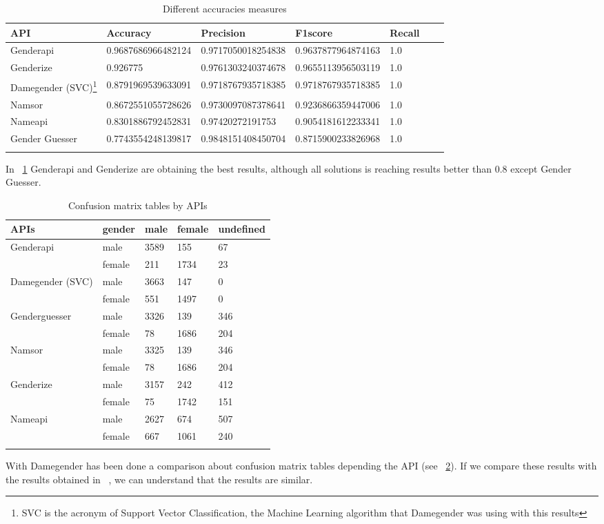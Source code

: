 \documentclass[a4paper]{article}
\begin{document}
\begin{longtable}[]{@{}lllllll@{}}
  \toprule
  API & Accuracy & Precision & F1score & Recall\tabularnewline
\midrule
\endhead
Genderapi & 0.9687686966482124 & 0.9717050018254838 & 0.9637877964874163 & 1.0\tabularnewline
Genderize & 0.926775 & 0.9761303240374678 & 0.9655113956503119 & 1.0\tabularnewline
Damegender (SVC)\footnote{SVC is the acronym of Support Vector Classification, the Machine Learning algorithm that Damegender was using with this results} & 0.8791969539633091 & 0.9718767935718385 & 0.9718767935718385 & 1.0\tabularnewline
Namsor & 0.8672551055728626 & 0.9730097087378641 & 0.9236866359447006 & 1.0\tabularnewline
Nameapi & 0.8301886792452831 & 0.97420272191753 & 0.9054181612233341 & 1.0\tabularnewline
Gender Guesser & 0.7743554248139817 & 0.9848151408450704 & 0.8715900233826968 & 1.0\tabularnewline
\bottomrule
\caption{Different accuracies measures}
\label{table:DifferentAccuraciesMeasures}
\end{longtable}

In ~\ref{table:DifferentAccuraciesMeasures} Genderapi and Genderize
are obtaining the best results, although all solutions is reaching
results better than 0.8 except Gender Guesser.

\begin{longtable}[]{@{}lllll@{}}
  \toprule
  APIs          & gender & male & female & undefined \tabularnewline
\midrule
\endhead
Genderapi         & male    & 3589 & 155  &  67 \tabularnewline
                  & female  & 211  & 1734 &  23 \tabularnewline
Damegender (SVC)\footnotemark[1]  & male    & 3663 & 147  &   0 \tabularnewline
                  & female  & 551  & 1497 &   0 \tabularnewline
Genderguesser     & male    & 3326 &  139 & 346 \tabularnewline
                  & female  & 78   & 1686 & 204 \tabularnewline
Namsor            & male    & 3325 & 139  & 346 \tabularnewline
                  & female  & 78   & 1686 & 204 \tabularnewline
Genderize         & male    & 3157 & 242  & 412 \tabularnewline
                  & female  & 75   & 1742 & 151 \tabularnewline
Nameapi           & male    & 2627 & 674  & 507 \tabularnewline
                  & female  & 667  & 1061 & 240 \tabularnewline 
\bottomrule
\caption{Confusion matrix tables by APIs}
\label{table:ConfusionMatrixTables}
\end{longtable}

With Damegender has been done a comparison about confusion matrix
tables depending the API (see ~\ref{table:ConfusionMatrixTables}). If
we compare these results with the results obtained in
~\cite{10.7717/peerj-cs.156}, we can understand that the results are
similar.
\end{document}
